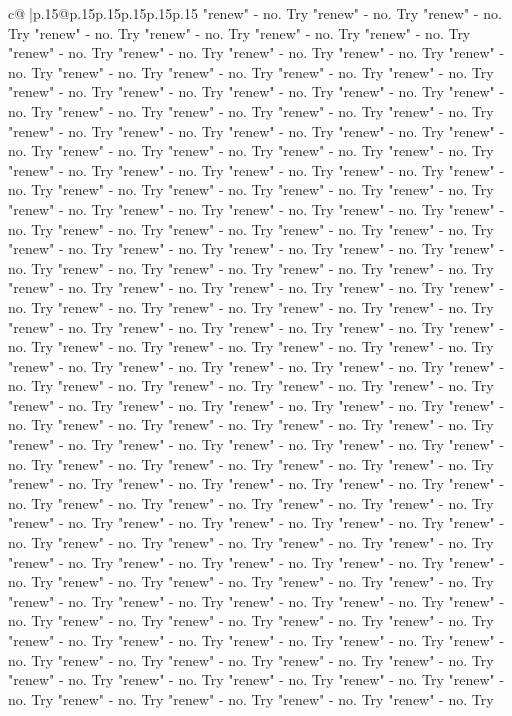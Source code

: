 \documentclass{article}
\begin{document}
{\begin{supertabular}{c@{$\;$}|p{.15\linewidth}@{}p{.15\linewidth}p{.15\linewidth}p{.15\linewidth}p{.15\linewidth}p{.15\linewidth}}
{{{"renew" {-} no. Try "renew" {-} no. Try "renew" {-} no. Try "renew" {-} no. Try "renew" {-} no. Try "renew" {-} no. Try "renew" {-} no. Try "renew" {-} no. Try "renew" {-} no. Try "renew" {-} no. Try "renew" {-} no. Try "renew" {-} no. Try "renew" {-} no. Try "renew" {-} no. Try "renew" {-} no. Try "renew" {-} no. Try "renew" {-} no. Try "renew" {-} no. Try "renew" {-} no. Try "renew" {-} no. Try "renew" {-} no. Try "renew" {-} no. Try "renew" {-} no. Try "renew" {-} no. Try "renew" {-} no. Try "renew" {-} no. Try "renew" {-} no. Try "renew" {-} no. Try "renew" {-} no. Try "renew" {-} no. Try "renew" {-} no. Try "renew" {-} no. Try "renew" {-} no. Try "renew" {-} no. Try "renew" {-} no. Try "renew" {-} no. Try "renew" {-} no. Try "renew" {-} no. Try "renew" {-} no. Try "renew" {-} no. Try "renew" {-} no. Try "renew" {-} no. Try "renew" {-} no. Try "renew" {-} no. Try "renew" {-} no. Try "renew" {-} no. Try "renew" {-} no. Try "renew" {-} no. Try "renew" {-} no. Try "renew" {-} no. Try "renew" {-} no. Try "renew" {-} no. Try "renew" {-} no. Try "renew" {-} no. Try "renew" {-} no. Try "renew" {-} no. Try "renew" {-} no. Try "renew" {-} no. Try "renew" {-} no. Try "renew" {-} no. Try "renew" {-} no. Try "renew" {-} no. Try "renew" {-} no. Try "renew" {-} no. Try "renew" {-} no. Try "renew" {-} no. Try "renew" {-} no. Try "renew" {-} no. Try "renew" {-} no. Try "renew" {-} no. Try "renew" {-} no. Try "renew" {-} no. Try "renew" {-} no. Try "renew" {-} no. Try "renew" {-} no. Try "renew" {-} no. Try "renew" {-} no. Try "renew" {-} no. Try "renew" {-} no. Try "renew" {-} no. Try "renew" {-} no. Try "renew" {-} no. Try "renew" {-} no. Try "renew" {-} no. Try "renew" {-} no. Try "renew" {-} no. Try "renew" {-} no. Try "renew" {-} no. Try "renew" {-} no. Try "renew" {-} no. Try "renew" {-} no. Try "renew" {-} no. Try "renew" {-} no. Try "renew" {-} no. Try "renew" {-} no. Try "renew" {-} no. Try "renew" {-} no. Try "renew" {-} no. Try "renew" {-} no. Try "renew" {-} no. Try "renew" {-} no. Try "renew" {-} no. Try "renew" {-} no. Try "renew" {-} no. Try "renew" {-} no. Try "renew" {-} no. Try "renew" {-} no. Try "renew" {-} no. Try "renew" {-} no. Try "renew" {-} no. Try "renew" {-} no. Try "renew" {-} no. Try "renew" {-} no. Try "renew" {-} no. Try "renew" {-} no. Try "renew" {-} no. Try "renew" {-} no. Try "renew" {-} no. Try "renew" {-} no. Try "renew" {-} no. Try "renew" {-} no. Try "renew" {-} no. Try "renew" {-} no. Try "renew" {-} no. Try "renew" {-} no. Try "renew" {-} no. Try "renew" {-} no. Try "renew" {-} no. Try "renew" {-} no. Try "renew" {-} no. Try "renew" {-} no. Try "renew" {-} no. Try "renew" {-} no. Try "renew" {-} no. Try "renew" {-} no. Try "renew" {-} no. Try "renew" {-} no. Try "renew" {-} no. Try "renew" {-} no. Try "renew" {-} no. Try "renew" {-} no. Try "renew" {-} no. Try "renew" {-} no. Try "renew" {-} no. Try "renew" {-} no. Try "renew" {-} no. Try "renew" {-} no. Try "renew" {-} no. Try "renew" {-} no. Try "renew" {-} no. Try "renew" {-} no. Try "renew" {-} no. Try "renew" {-} no. Try "renew" {-} no. Try "renew" {-} no. Try "renew" {-} no. Try "renew" {-} no. Try "renew" {-} no. Try "renew" {-} no. Try "renew" {-} no. Try }}}
\end{supertabular}}
\end{document}
